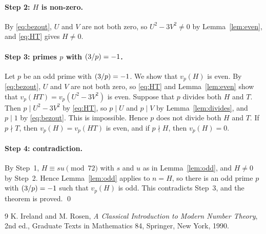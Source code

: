 \documentclass[11pt]{article}
\newcommand{\leg}[2]{\mathchoice{\biggl(\dfrac{#1}{#2}\biggr)}{(#1/#2)}{(#1/#2)}{(#1/#2)}}
\begin{document}
\paragraph{Step 2: $H$ is non-zero.} By \eqref{eq:bezout}, $U$ and $V$ are not both zero, so $U^2-3V^2\neq0$ by Lemma~\ref{lem:even}, and \eqref{eq:HT} gives $H\neq0$.

\paragraph{\texorpdfstring{Step 3: primes $p$ with $\leg{3}{p}=-1$.}{Step 3: inert primes.}} Let $p$ be an odd prime with $\leg{3}{p}=-1$. We show that $v_p(H)$ is even. By \eqref{eq:bezout}, $U$ and $V$ are not both zero, so \eqref{eq:HT} and Lemma~\ref{lem:even} show that $v_p(HT)=v_p(U^2-3V^2)$ is even. Suppose that $p$ divides both $H$ and $T$. Then $p\mid U^2-3V^2$ by \eqref{eq:HT}, so $p\mid U$ and $p\mid V$ by Lemma~\ref{lem:divides}, and $p\mid 1$ by \eqref{eq:bezout}. This is impossible. Hence $p$ does not divide both $H$ and $T$. If $p\nmid T$, then $v_p(H)=v_p(HT)$ is even, and if $p\nmid H$, then $v_p(H)=0$.

\paragraph{Step 4: contradiction.} By Step~1, $H\equiv su\pmod{72}$ with $s$ and $u$ as in Lemma~\ref{lem:odd}, and $H\neq0$ by Step~2. Hence Lemma~\ref{lem:odd} applies to $n=H$, so there is an odd prime $p$ with $\leg{3}{p}=-1$ such that $v_p(H)$ is odd. This contradicts Step~3, and the theorem is proved.
\qed

\begin{thebibliography}{9}
 K. Ireland and M. Rosen, \emph{A Classical Introduction to Modern Number Theory}, 2nd ed., Graduate Texts in Mathematics 84, Springer, New York, 1990.
\end{thebibliography}
\end{document}
